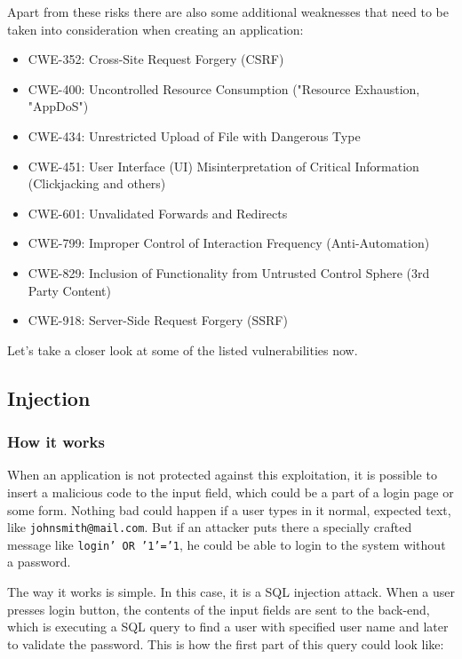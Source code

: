 \documentclass[a4paper]{article}
\begin{document}
Apart from these risks there are also some additional weaknesses that need to be
taken into consideration when creating an application:

\begin{itemize}
	\item CWE-352: Cross-Site Request Forgery (CSRF)
	\item CWE-400: Uncontrolled Resource Consumption ("Resource Exhaustion,
		"AppDoS")
	\item CWE-434: Unrestricted Upload of File with Dangerous Type
	\item CWE-451: User Interface (UI) Misinterpretation of Critical
		Information (Clickjacking and others)
	\item CWE-601: Unvalidated Forwards and Redirects
	\item CWE-799: Improper Control of Interaction Frequency
		(Anti-Automation)
	\item CWE-829: Inclusion of Functionality from Untrusted Control Sphere
		(3rd Party Content)
	\item CWE-918: Server-Side Request Forgery (SSRF)
\end{itemize}

Let's take a closer look at some of the listed vulnerabilities now.

\subsection{Injection}

\subsubsection{How it works}

When an application is not protected against this exploitation, it is possible
to insert a malicious code to the input field, which could be a part of a login
page or some form. Nothing bad could happen if a user types in it normal,
expected text, like \texttt{johnsmith@mail.com}. But if an attacker puts there a
specially crafted message like \texttt{login' OR '1'='1}, he could be able to
login to the system without a password.

The way it works is simple. In this case, it is a SQL injection attack. When a
user presses login button, the contents of the input fields are sent to the
back-end, which is executing a SQL query to find a user with specified user name
and later to validate the password. This is how the first part of this query
could look like:
\end{document}
